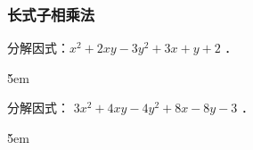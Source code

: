 \subsubsection{长式子相乘法}

\begin{example}
    分解因式：$x^2+2 x y-3 y^2+3 x+y+2$ ．
\end{example}

\v{5em}

\begin{example}
    分解因式： $3 x^2+4 x y-4 y^2+8 x-8 y-3$ ．
\end{example}

\v{5em}

